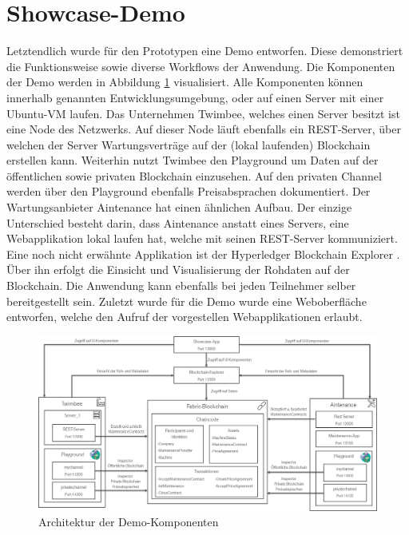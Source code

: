 \section{Showcase-Demo}
Letztendlich wurde für den Prototypen eine Demo entworfen. Diese demonstriert die Funktionsweise sowie diverse Workflows der Anwendung. Die Komponenten der Demo werden in Abbildung \ref{fig:architecture-showcase} visualisiert. Alle Komponenten können innerhalb genannten Entwicklungsumgebung, oder auf einen Server mit einer Ubuntu-VM laufen. Das Unternehmen Twimbee, welches einen Server besitzt ist eine Node des Netzwerks. Auf dieser Node läuft ebenfalls ein REST-Server, über welchen der Server Wartungsverträge auf der (lokal laufenden) Blockchain erstellen kann. Weiterhin nutzt Twimbee den Playground um Daten auf der öffentlichen sowie privaten Blockchain einzusehen. Auf den privaten Channel werden über den Playground ebenfalls Preisabsprachen dokumentiert. Der Wartungsanbieter Aintenance hat einen ähnlichen Aufbau. Der einzige Unterschied besteht darin, dass Aintenance anstatt eines Servers, eine Webapplikation lokal laufen hat, welche mit seinen REST-Server kommuniziert. Eine noch nicht erwähnte Applikation ist der Hyperledger Blockchain Explorer \cite{HyperledgerBlockchainExplorerTeamHyperledgerBlockchainExplorer2018}. Über ihn erfolgt die Einsicht und Visualisierung der Rohdaten auf der Blockchain. Die Anwendung kann ebenfalls bei jeden Teilnehmer selber bereitgestellt sein. Zuletzt wurde für die Demo wurde eine Weboberfläche entworfen, welche den Aufruf der vorgestellen Webapplikationen erlaubt.

\begin{figure}[!htbp]
    \centering
      \includegraphics[width=1.0\textwidth,angle=0]{images/architecture_showcase}
       \caption{Architektur der Demo-Komponenten}
      \label{fig:architecture-showcase}
\end{figure}

